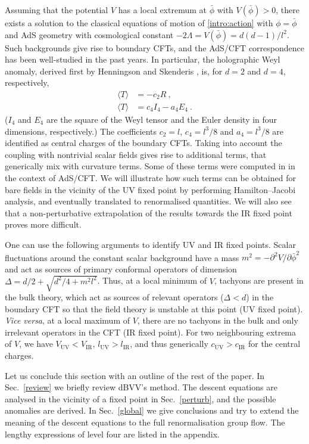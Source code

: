\documentclass[a4paper,12pt]{article}
\begin{document}
Assuming that the potential $V$ has a local extremum at $\bar{\phi}$
with $V(\bar{\phi})>0$, there exists a solution to the classical equations of
motion of \eqref{intro:action} with $\phi=\bar{\phi}$ and
AdS geometry with cosmological constant $-2\Lambda= 
V(\bar{\phi}) = d(d-1)/l^2$. Such backgrounds give rise to boundary
CFTs, and the AdS/CFT correspondence has been
well-studied in the past years. In particular, the holographic Weyl
anomaly, derived first by Henningson and Skenderis
\cite{Henningson98-2}, is, for $d=2$ and $d=4$, respectively, 
\begin{align}
\label{intro:anomd2}
  \langle T \rangle &= -c_2 R~,\\
\label{intro:anomd4}
  \langle T \rangle &= c_4 I_4 - a_4 E_4~. 
\end{align}
($I_4$ and $E_4$ are the square of the Weyl tensor and the Euler
density in four dimensions, respectively.) The coefficients $c_2=l$,
$c_4=l^3/8$ and $a_4=l^3/8$ 
are identified as central charges of the boundary CFTs. Taking into account
the coupling with nontrivial scalar fields gives rise to additional terms,
that generically mix with curvature terms. Some of these terms 
were computed in \cite{Liu98-1} in the context of AdS/CFT. We will illustrate 
how such terms can be obtained for bare fields in the vicinity of the UV
fixed point by performing Hamilton--Jacobi analysis, and eventually
translated to renormalised quantities. We will also see that a
non-perturbative 
extrapolation of the results towards the IR fixed point proves more 
difficult.
 
One can use the following arguments \cite{Freedman00a} to identify UV
and IR fixed points. Scalar fluctuations around the constant scalar
background have a mass $m^2 = - 
\partial^2 V /\partial\bar{\phi}^2$ and act as sources of primary conformal 
operators of dimension $\Delta=d/2 + \sqrt{d^2/4+m^2l^2}$. Thus, at a
local minimum of $V$, tachyons are present in the bulk theory,
which act as sources of relevant operators ($\Delta<d$) in the
boundary CFT so that the field theory is unstable at this point (UV
fixed point). \emph{Vice versa}, at a local maximum of $V$, there are no 
tachyons in the bulk and only irrelevant operators in the CFT (IR
fixed point). For two neighbouring
extrema of $V$, we have $V_{\mathrm{UV}}<V_{\mathrm{IR}}$,
$l_{\mathrm{UV}}>l_{\mathrm{IR}}$, and thus generically
$c_{\mathrm{UV}}>c_{\mathrm{IR}}$ for the central charges. 

Let us conclude this section with an outline of the rest of the
paper. In Sec.\ \ref{review} we briefly review dBVV's method. The
descent equations are analysed in the vicinity of a fixed point in
Sec.\ \ref{perturb}, and the possible anomalies are derived. In Sec.\
\ref{global} we give conclusions and try to extend the meaning of the
descent equations to the full renormalisation group flow. The lengthy
expressions of level four are listed in the appendix. 
\end{document}
